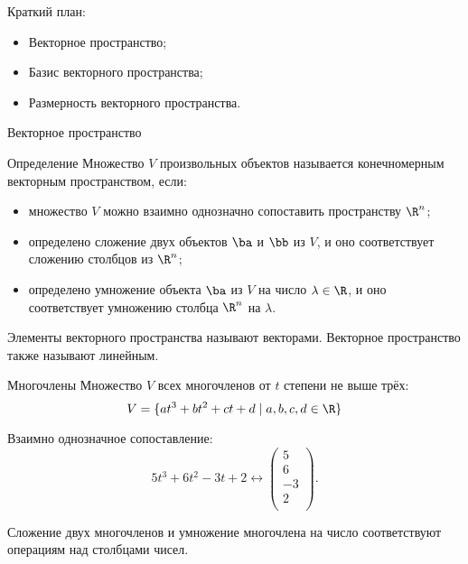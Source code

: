 
\begin{frame} %


\end{frame}



\begin{frame}{Краткий план:}
  \begin{itemize}[<+->]
    \item Векторное пространство;
    \item Базис векторного пространства;
    \item Размерность векторного пространства.
  \end{itemize}

\end{frame}


\begin{frame}{Векторное пространство}

\begin{block}{Определение} 
Множество $V$ произвольных объектов называется \alert{конечномерным векторным пространством}, если:

\begin{itemize}[<+->]
\item множество $V$ можно взаимно однозначно сопоставить пространству $\R^n$;
\item определено сложение двух объектов $\ba$ и $\bb$ из $V$, 
и оно соответствует сложению столбцов из $\R^n$;
\item определено умножение объекта $\ba$ из $V$ на число $\lambda\in \R$, 
и оно соответствует умножению столбца $\R^n$ на $\lambda$.
\end{itemize}
\end{block}

Элементы векторного пространства называют \alert{векторами}. 
\pause
Векторное пространство также называют \alert{линейным}.

\end{frame}



\begin{frame}{Многочлены}
Множество $V$ всех многочленов от $t$ степени не выше трёх:
\[
V  = \{ at^3 + bt^2 + ct + d \mid a, b, c, d \in \R \}
\]

\pause
Взаимно однозначное сопоставление: 
\[5t^3 + 6t^2 - 3t + 2 \leftrightarrow \begin{pmatrix} 
    5 \\
    6 \\
    -3 \\
    2 \\
\end{pmatrix}.
\]
\pause


Сложение двух многочленов и умножение многочлена на число соответствуют операциям над столбцами чисел.
\end{frame}





